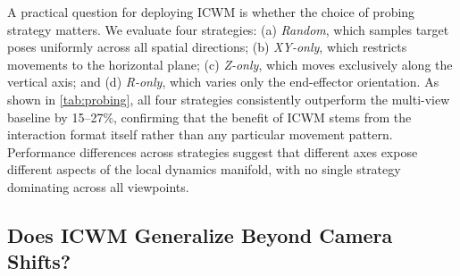 \documentclass{llmxive}
\begin{document}
\begin{table}[t]
\centering
\small
\vspace{-5mm}
\vspace{-10pt}

\caption{Success rates (\%) under different probing strategies on OOD viewpoints.}
\label{tab:probing}
\end{table}
A practical question for deploying ICWM is whether the choice of probing strategy matters. 
We evaluate four strategies: (a) \textit{Random}, which samples target poses uniformly across all spatial directions; 
(b) \textit{XY-only}, which restricts movements to the horizontal plane; (c)
\textit{Z-only}, which moves exclusively along the vertical axis; and (d) \textit{R-only}, which varies only the end-effector orientation.
As shown in \autoref{tab:probing}, all four strategies consistently outperform the multi-view baseline by 15–27\%, confirming that the benefit of ICWM stems from the interaction format itself rather than any particular movement pattern. 
Performance differences across strategies suggest that different axes expose different aspects of the local dynamics manifold, with no single strategy dominating across all viewpoints.




\subsection{Does ICWM Generalize Beyond Camera Shifts?}
\end{document}
